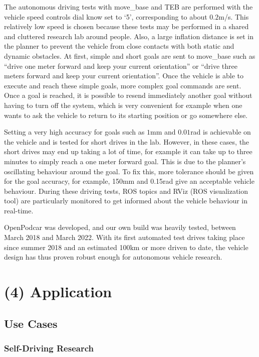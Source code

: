 \documentclass[a4paper]{article}
\begin{document}
	The autonomous driving tests with move\_base and TEB are performed with the vehicle speed controls dial know set to `5', corresponding to about $0.2$m/s. This relatively low speed is chosen because these tests may be performed in a shared and cluttered research lab around people. Also, a large inflation distance is set in the planner to prevent the vehicle from close contacts with both static and dynamic obstacles. At first, simple and short goals are sent to move\_base such as ``drive one meter forward and keep your current orientation'' or ``drive three meters forward and keep your current orientation''. Once the vehicle is able to execute and reach these simple goals, more complex goal commands are sent. Once a goal is reached, it is possible to resend immediately another goal without having to turn off the system, which is very convenient for example when one wants to ask the vehicle to return to its starting position or go somewhere else. 
	
	Setting a very high accuracy for goals such as $1$mm and $0.01$rad is achievable on the vehicle and is tested for short drives in the lab. However, in these cases, the short drives may end up taking a lot of time, for example it can take up to three minutes to simply reach a one meter forward goal. This is due to the planner's oscillating behaviour around the goal. To fix this, more tolerance should be given for the goal accuracy, for example, 150mm and 0.15rad give an acceptable vehicle behaviour. During these driving tests, ROS topics and RViz (ROS visualization tool) are particularly monitored to get informed about the vehicle behaviour in real-time. 
	
	OpenPodcar was developed, and our own build was heavily tested, between March 2018 and March 2022. With its first automated test drives taking place since summer 2018 and an estimated 100km or more driven to date, the vehicle design has thus proven robust enough for autonomous vehicle research. 
	
	
	\section{(4) Application}\label{h.f78bi3oom0mu}
	
	\subsection{Use Cases}
	
	\subsubsection{Self-Driving  Research}\label{h.4q5g9edishy3}
	
\end{document}
